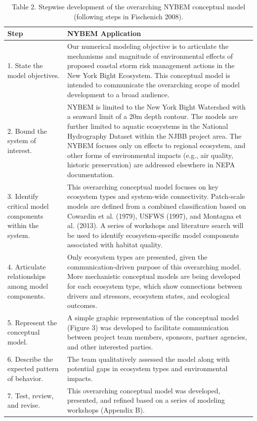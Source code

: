 \documentclass[
]{book}
\begin{document}
\begin{table}

\caption{\label{tab:unnamed-chunk-4}Table 2. Stepwise development of the overarching NYBEM conceptual model (following steps in Fischenich 2008).}
\centering
\begin{tabular}[t]{l|l}
\hline
Step & NYBEM Application\\
\hline
1. State the model objectives. & Our numerical modeling objective is to articulate the mechanisms and magnitude of environmental effects of proposed coastal storm risk management actions in the New York Bight Ecosystem. This conceptual model is intended to communicate the overarching scope of model development to a broad audience.\\
\hline
2. Bound the system of interest. & NYBEM is limited to the New York Bight Watershed with a seaward limit of a 20m depth contour. The models are further limited to aquatic ecosystems in the National Hydrography Dataset within the NJBB project area. The NYBEM focuses only on effects to regional ecosystem, and other forms of environmental impacts (e.g., air quality, historic preservation) are addressed elsewhere in NEPA documentation.\\
\hline
3. Identify critical model components within the system. & This overarching conceptual model focuses on key ecosystem types and system-wide connectivity. Patch-scale models are defined from a combined classification based on Cowardin et al. (1979), USFWS (1997), and Montagna et al. (2013). A series of workshops and literature search will be used to identify ecosystem-specific model components associated with habitat quality.\\
\hline
4. Articulate relationships among model components. & Only ecosystem types are presented, given the communication-driven purpose of this overarching model. More mechanistic conceptual models are being developed for each ecosystem type, which show connections between drivers and stressors, ecosystem states, and ecological outcomes.\\
\hline
5. Represent the conceptual model. & A simple graphic representation of the conceptual model (Figure 3) was developed to facilitate communication between project team members, sponsors, partner agencies, and other interested parties.\\
\hline
6. Describe the expected pattern of behavior. & The team qualitatively assessed the model along with potential gaps in ecosystem types and environmental impacts.\\
\hline
7. Test, review, and revise. & This overarching conceptual model was developed, presented, and refined based on a series of modeling workshops (Appendix B).\\
\hline
\end{tabular}
\end{table}
\end{document}
